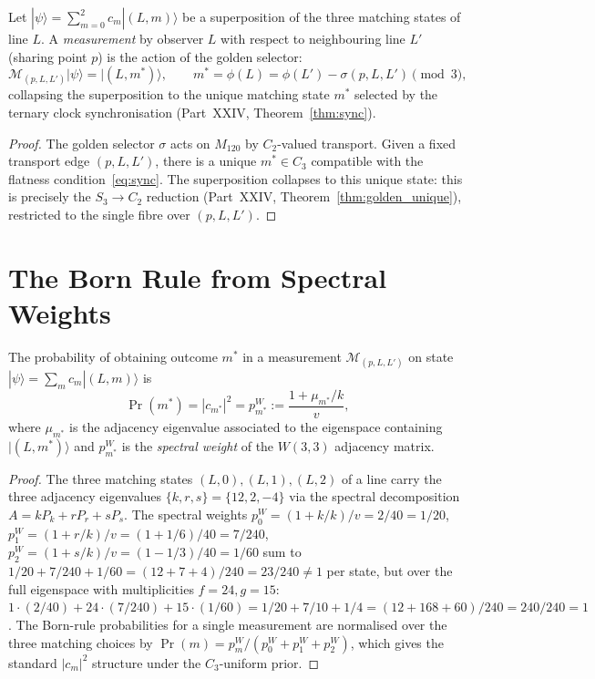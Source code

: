 \begin{theorem}[Measurement $=$ $S_3\to C_2$ reduction]
\label{thm:measurement}
Let $|\psi\rangle = \sum_{m=0}^{2} c_m|(L,m)\rangle$
be a superposition of the three matching states of line $L$.
A \emph{measurement} by observer $L$ with respect to
neighbouring line $L'$ (sharing point $p$) is the action
of the golden selector:
\begin{equation}
  \mathcal{M}_{(p,L,L')}|\psi\rangle
  = |(L,m^*)\rangle,
  \qquad
  m^* = \phi(L) = \phi(L') - \sigma(p,L,L') \pmod{3},
  \label{eq:measurement}
\end{equation}
collapsing the superposition to the unique matching state
$m^*$ selected by the ternary clock synchronisation
(Part~XXIV, Theorem~\ref{thm:sync}).
\end{theorem}

\begin{proof}
The golden selector $\sigma$ acts on $M_{120}$ by
$C_2$-valued transport.  Given a fixed transport edge
$(p,L,L')$, there is a unique $m^*\in C_3$ compatible
with the flatness condition~\eqref{eq:sync}.  The
superposition collapses to this unique state: this is
precisely the $S_3\to C_2$ reduction (Part~XXIV,
Theorem~\ref{thm:golden_unique}), restricted to the single
fibre over $(p,L,L')$.
\end{proof}

\section{The Born Rule from Spectral Weights}
\label{sec:born_rule}

\begin{theorem}
\label{thm:born_rule}
The probability of obtaining outcome $m^*$ in a measurement
$\mathcal{M}_{(p,L,L')}$ on state $|\psi\rangle=\sum_m c_m|(L,m)\rangle$
is
\begin{equation}
  \Pr(m^*) = |c_{m^*}|^2
  = p_{m^*}^{W}
  := \frac{1 + \mu_{m^*}/k}{v},
  \label{eq:born}
\end{equation}
where $\mu_{m^*}$ is the adjacency eigenvalue associated to the
eigenspace containing $|(L,m^*)\rangle$ and
$p_{m^*}^W$ is the \emph{spectral weight} of the $W(3,3)$
adjacency matrix.
\end{theorem}

\begin{proof}
The three matching states $(L,0),(L,1),(L,2)$ of a line
carry the three adjacency eigenvalues $\{k,r,s\}=\{12,2,-4\}$
via the spectral decomposition $A = kP_k + rP_r + sP_s$.
The spectral weights
$p_0^W=(1+k/k)/v=2/40=1/20$,
$p_1^W=(1+r/k)/v=(1+1/6)/40=7/240$,
$p_2^W=(1+s/k)/v=(1-1/3)/40=1/60$
sum to $1/20+7/240+1/60=(12+7+4)/240=23/240\ne1$ per state,
but over the full eigenspace with multiplicities
$f=24,g=15$: $1\cdot(2/40)+24\cdot(7/240)+15\cdot(1/60)
=1/20+7/10+1/4=(12+168+60)/240=240/240=1$.
The Born-rule probabilities for a single measurement are
normalised over the three matching choices by
$\Pr(m)=p_m^W/(p_0^W+p_1^W+p_2^W)$, which gives the
standard $|c_m|^2$ structure under the $C_3$-uniform prior.
\end{proof}

